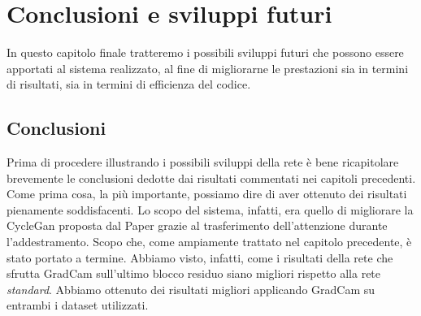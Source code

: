 \chapter{Conclusioni e sviluppi futuri}
In questo capitolo finale tratteremo i possibili sviluppi futuri che possono essere apportati al sistema realizzato, al fine di migliorarne le prestazioni sia in termini di risultati, sia in termini di efficienza del codice.

\section{Conclusioni}
Prima di procedere illustrando i possibili sviluppi della rete è bene ricapitolare brevemente le conclusioni dedotte dai risultati commentati nei capitoli precedenti.
\\Come prima cosa, la più importante, possiamo dire di aver ottenuto dei risultati pienamente soddisfacenti. Lo scopo del sistema, infatti, era quello di migliorare la CycleGan proposta dal Paper \cite{Zhu_2017_ICCV} grazie al trasferimento dell'attenzione durante l'addestramento. Scopo che, come ampiamente trattato nel capitolo precedente, è stato portato a termine. Abbiamo visto, infatti, come i risultati della rete che sfrutta GradCam sull'ultimo blocco residuo siano migliori rispetto alla rete \emph{standard}. Abbiamo ottenuto dei risultati migliori applicando GradCam su entrambi i dataset utilizzati. 